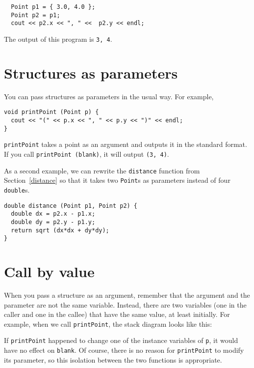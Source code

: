 \begin{verbatim}
  Point p1 = { 3.0, 4.0 };
  Point p2 = p1;
  cout << p2.x << ", " <<  p2.y << endl;
\end{verbatim}
%
The output of this program is {\tt 3, 4}.

\section{Structures as parameters}

You can pass structures as parameters in the usual way.  For
example,

\begin{verbatim}
void printPoint (Point p) {
  cout << "(" << p.x << ", " << p.y << ")" << endl;
}
\end{verbatim}
%
{\tt printPoint} takes a point as an argument and outputs it in
the standard format.  If you call {\tt printPoint (blank)},
it will output {\tt (3, 4)}.

As a second example, we can rewrite the {\tt distance} function from
Section~\ref{distance} so that it takes two {\tt Point}s as parameters
instead of four {\tt double}s.

\begin{verbatim}
double distance (Point p1, Point p2) {
  double dx = p2.x - p1.x;
  double dy = p2.y - p1.y;
  return sqrt (dx*dx + dy*dy);
}
\end{verbatim}

\section{Call by value}

When you pass a structure as an argument, remember that the
argument and the parameter are not the same variable.  Instead,
there are two variables (one in the caller and one in the
callee) that have the same value, at least initially.  For
example, when we call {\tt printPoint}, the stack diagram
looks like this:

\vspace{0.1in}
\centerline{}
\vspace{0.1in}
%
If {\tt printPoint} happened to change one of the instance variables
of {\tt p}, it would have no effect on {\tt blank}.  Of course, there
is no reason for {\tt printPoint} to modify its parameter, so this
isolation between the two functions is appropriate.

